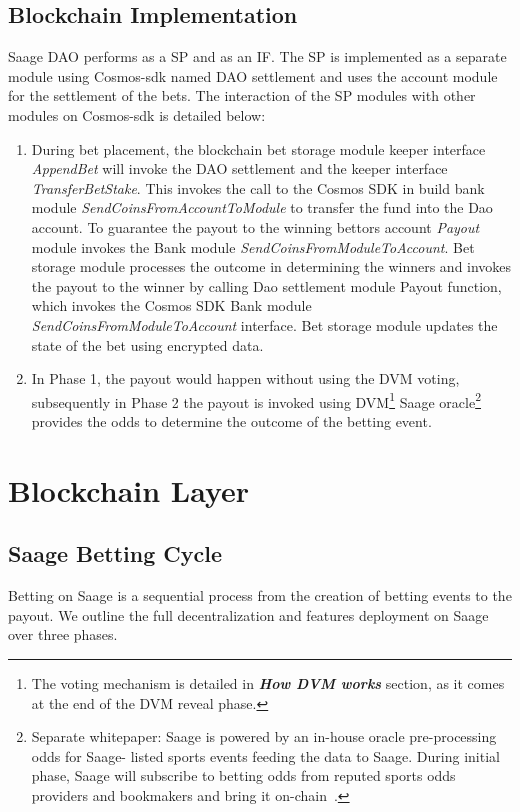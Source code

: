 \documentclass[%
 reprint,
 amsmath,amssymb,
 aps,
]{revtex4-2}
\begin{document}
\subsection{Blockchain Implementation} 
Saage DAO performs as a SP and as an IF. The SP is implemented as a separate module using Cosmos-sdk named DAO settlement and uses the account module for the settlement of the bets. The interaction of the SP modules with other modules on Cosmos-sdk is detailed below: 

\begin{enumerate}

\item During bet placement, the blockchain bet storage module keeper interface \textit{AppendBet} will invoke the DAO settlement and the keeper interface \textit{TransferBetStake}. This invokes the call to the Cosmos SDK in build bank module \textit{SendCoinsFromAccountToModule} to transfer the fund into the Dao account. To guarantee the payout to the winning bettors account \textit{Payout} module invokes the Bank module \textit{SendCoinsFromModuleToAccount}. Bet storage module processes the outcome in determining the winners and invokes the payout to the winner by calling Dao settlement module Payout function, which invokes the Cosmos SDK Bank module \textit{SendCoinsFromModuleToAccount} interface. Bet storage module updates the state of the bet using encrypted data. 
\item In Phase 1, the payout would happen without using the DVM voting, subsequently in Phase 2 the payout is invoked using DVM\footnote{The voting mechanism is detailed in \textbf{\textit{How DVM works}} section, as it comes at the end of the DVM reveal phase.} 
Saage oracle\footnote{Separate whitepaper: Saage is powered by an in-house oracle pre-processing odds for Saage- listed sports events feeding the data to Saage. During initial phase, Saage will subscribe to betting odds from reputed sports odds providers and bookmakers and bring it on-chain~\cite{Oracle}.} provides the odds to determine the outcome of the betting event. 
\end{enumerate}


\section{Blockchain Layer}\label{Section4}

\subsection{Saage Betting Cycle} 
Betting on Saage is a sequential process from the creation of betting events to the payout. We outline the full decentralization and features deployment on Saage over three phases.
\end{document}
